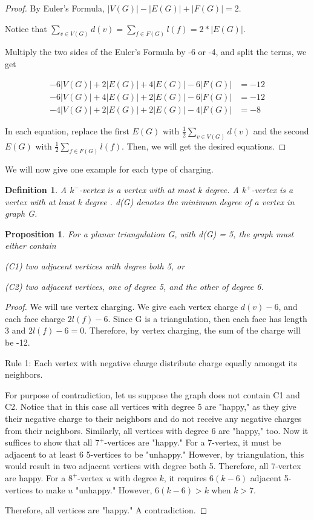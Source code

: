 \documentclass[a4paper, 11pt]{article} %
\newtheorem*{definition}{Definition}
\newtheorem{proposition}{Proposition}[section]
\begin{document}
\begin{proof}
\cite{cranston2013guide} By Euler's Formula, $|V(G)| - |E(G)| + |F(G)| = 2$. 

Notice that $\sum_{v\in V(G)}d(v) = \sum_{f\in F(G)}l(f) = 2*|E(G)|$.

Multiply the two sides of the Euler's Formula by -6 or -4, and split the terms, we get 

\begin{align*} 
-6|V(G)| + 2|E(G)| + 4|E(G)| - 6|F(G)| &= -12\\ 
-6|V(G)| + 4|E(G)| + 2|E(G)| - 6|F(G)| &= -12\\
-4|V(G)| + 2|E(G)| + 2|E(G)| - 4|F(G)| &= -8
\end{align*}

In each equation, replace the first $E(G)$ with $\frac{1}{2}\sum_{v\in V(G)}d(v)$ and the second $E(G)$ with $\frac{1}{2}\sum_{f\in F(G)}l(f)$. Then, we will get the desired equations.
\end{proof}

We will now give one example for each type of charging. 
 
 \begin{definition}
  A $k^{-}$-vertex is a vertex with at most k degree. A $k^{+}$-vertex is a vertex with at least k degree \cite{cranston2013guide}. d(G) denotes the minimum degree of a vertex in graph G.
 \end{definition}

 
\begin{proposition}
\cite{west_introduction_2000} For a planar triangulation G, with d(G) = 5, the graph must either contain

(C1) two adjacent vertices with degree both 5, or

(C2) two adjacent vertices, one of degree 5, and the other of degree 6.
\end{proposition} 


\begin{proof}
We will use vertex charging. We give each vertex charge $d(v) - 6$, and each face charge $2l(f) - 6$. Since G is a triangulation, then each face has length 3 and $2l(f) - 6 = 0$. Therefore, by vertex charging, the sum of the charge will be -12. 

Rule 1: Each vertex with negative charge distribute charge equally amongst its neighbors.

For purpose of contradiction, let us suppose the graph does not contain C1 and C2. Notice that in this case all vertices with degree 5 are "happy," as they give their negative charge to their neighbors and do not receive any negative charges from their neighbors. Similarly, all vertices with degree 6 are "happy," too. Now it suffices to show that all $7^{+}$-vertices are "happy."
For a $7$-vertex, it must be adjacent to at least 6 5-vertices to be "unhappy." However, by triangulation, this would result in two adjacent vertices with degree both 5. Therefore, all $7$-vertex are happy. For a $8^{+}$-vertex $u$ with degree $k$, it requires $6(k - 6)$ adjacent 5-vertices to make $u$ "unhappy." However, $6(k-6) > k$ when $k > 7$. 

Therefore, all vertices are "happy." A contradiction. 
\end{proof}
 
\end{document}
